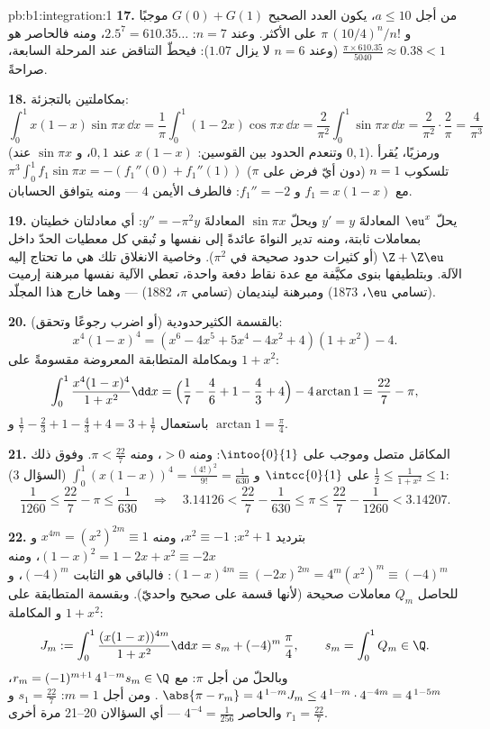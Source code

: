 \begin{solution}{pb:b1:integration:1}
\textbf{17.} من أجل $a \leq 10$، يكون العدد الصحيح $G(0) + G(1)$
موجبًا و $\pi\,(10/4)^n/n!$ على الأكثر. وعند $n = 7$:
$2.5^7 = 610.35\dots$، ومنه فالحاصر هو $\frac{\pi \times
610.35}{5040} \approx 0.38 < 1$ (وعند $n = 6$ لا يزال
$1.07$): فيحطّ التناقض عند المرحلة السابعة،
صراحةً.

\textbf{18.} بمكاملتين بالتجزئة:
\[
\int_0^1 x(1-x)\sin\pi x\,\dd x
= \frac1\pi\int_0^1 (1 - 2x)\cos\pi x\,\dd x
= \frac{2}{\pi^2}\int_0^1 \sin\pi x\,\dd x
= \frac{2}{\pi^2}\cdot\frac{2}{\pi} = \frac{4}{\pi^3}
\]
(وتنعدم الحدود بين القوسين: $x(1-x)$ عند $0, 1$، و $\sin\pi x$
عند $0, 1$). ورمزيًا، يُقرأ تلسكوب $n = 1$ (دون أيّ فرض
على $\pi$) $\pi^3\int_0^1 f_1\sin\pi x = -(f_1''(0) +
f_1''(1))$ مع $f_1 = x(1 - x)$ و $f_1'' = -2$: فالطرف الأيمن $4$
--- ومنه يتوافق الحسابان.

\textbf{19.} يحلّ $\eu^x$ المعادلةَ $y' = y$ ويحلّ $\sin\pi x$ المعادلةَ
$y'' = -\pi^2 y$: أي معادلتان خطيتان بمعاملات ثابتة،
ومنه تدير  النواةَ عائدةً إلى نفسها و
تُبقي كل معطيات الحدّ داخل $\Z + \Z\eu$ (أو كثيرات
حدود صحيحة في $\pi^2$). وخاصية الانغلاق تلك هي ما تحتاج إليه
الآلة. وبتلطيفها بنوى مكيَّفة مع عدة نقاط
دفعة واحدة، تعطي الآلية نفسها مبرهنة إرميت (تسامي $\eu$،
1873) ومبرهنة لينديمان (تسامي $\pi$،
1882) --- وهما خارج هذا المجلّد.

\textbf{20.} بالقسمة الكثيرحدودية (أو اضرب رجوعًا وتحقق):
\[
x^4(1-x)^4 = (x^6 - 4x^5 + 5x^4 - 4x^2 + 4)(1 + x^2) - 4 .
\]
وبمكاملة المتطابقة المعروضة مقسومةً على $1 + x^2$:
\[
\int_0^1 \frac{x^4(1-x)^4}{1+x^2}\dd x
= \Bigl(\frac17 - \frac46 + 1 - \frac43 + 4\Bigr)
- 4\arctan 1
= \frac{22}{7} - \pi ,
\]
باستعمال $\frac17 - \frac23 + 1 - \frac43 + 4 = 3 + \frac17$ و
$\arctan 1 = \frac\pi4$.

\textbf{21.} المكامَل متصل وموجب على
$\intoo{0}{1}$: ومنه  $> 0$، ومنه $\pi < \frac{22}{7}$.
وفوق ذلك $\frac12 \leq \frac{1}{1+x^2} \leq 1$ على
$\intcc{0}{1}$ و $\int_0^1 (x(1-x))^4 = \frac{(4!)^2}{9!} =
\frac{1}{630}$ (السؤال 3):
\[
\frac{1}{1260} \leq \frac{22}{7} - \pi \leq \frac{1}{630}
\quad\Longrightarrow\quad
3.14126 < \frac{22}{7} - \frac{1}{630} \leq \pi \leq
\frac{22}{7} - \frac{1}{1260} < 3.14207 .
\]

\textbf{22.} بترديد $x^2 + 1$: $x^2 \equiv -1$، ومنه $x^{4m} =
(x^2)^{2m} \equiv 1$ و $(1 - x)^2 = 1 - 2x + x^2 \equiv -2x$،
ومنه $(1-x)^{4m} \equiv (-2x)^{2m} = 4^m (x^2)^m \equiv
(-4)^m$: فالباقي هو الثابت $(-4)^m$، و
للحاصل $Q_m$ معاملات صحيحة (لأنها قسمة على 
صحيح واحديّ). وبقسمة المتطابقة على $1 + x^2$ و
المكاملة:
\[
J_m := \int_0^1 \frac{(x(1-x))^{4m}}{1+x^2}\dd x
= s_m + (-4)^m\,\frac{\pi}{4},
\qquad s_m = \int_0^1 Q_m \in \Q .
\]
وبالحلّ من أجل $\pi$: مع $r_m = (-1)^{m+1}\,4^{\,1-m} s_m \in
\Q$، $\;\abs{\pi - r_m} = 4^{\,1-m} J_m \leq
4^{\,1-m}\cdot4^{-4m} = 4^{\,1-5m}$. ومن أجل $m = 1$: $s_1 =
\frac{22}{7}$ و $r_1 = \frac{22}{7}$ والحاصر $4^{-4} =
\frac{1}{256}$ --- أي السؤالان 20--21 مرة أخرى.


\end{solution}
